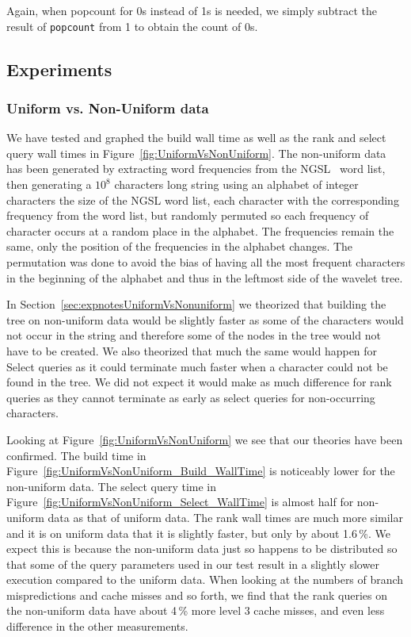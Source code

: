 Again, when popcount for 0s instead of 1s is needed, we simply subtract the result of \texttt{popcount} from 1 to obtain the count of 0s.

\subsection{Experiments}

\subsubsection{Uniform vs. Non-Uniform data}
\label{sec:uniformVsNonUniform}
We have tested and graphed the build wall time as well as the rank and select query wall times in Figure~\ref{fig:UniformVsNonUniform}.
The non-uniform data has been generated by extracting word frequencies from the NGSL~ word list, then generating a $10^8$ characters long string using an alphabet of integer characters the size of the NGSL word list, each character with the corresponding frequency from the word list, but randomly permuted so each frequency of character occurs at a random place in the alphabet. The frequencies remain the same, only the position of the frequencies in the alphabet changes.
The permutation was done to avoid the bias of having all the most frequent characters in the beginning of the alphabet and thus in the leftmost side of the wavelet tree.

In Section~\ref{sec:expnotesUniformVsNonuniform} we theorized that building the tree on non-uniform data would be slightly faster as some of the characters would not occur in the string and therefore some of the nodes in the tree would not have to be created.
We also theorized that much the same would happen for Select queries as it could terminate much faster when a character could not be found in the tree.
We did not expect it would make as much difference for rank queries as they cannot terminate as early as select queries for non-occurring characters.

Looking at Figure~\ref{fig:UniformVsNonUniform} we see that our theories have been confirmed. 
The build time in Figure~\ref{fig:UniformVsNonUniform_Build_WallTime} is noticeably lower for the non-uniform data.
The select query time in Figure~\ref{fig:UniformVsNonUniform_Select_WallTime} is almost half for non-uniform data as that of uniform data.
The rank wall times are much more similar and it is on uniform data that it is slightly faster, but only by about 1.6\,\%.
We expect this is because the non-uniform data just so happens to be distributed so that some of the query parameters used in our test result in a slightly slower execution compared to the uniform data.
When looking at the numbers of branch mispredictions and cache misses and so forth, we find that the rank queries on the non-uniform data have about 4\,\% more level 3 cache misses, and even less difference in the other measurements.


